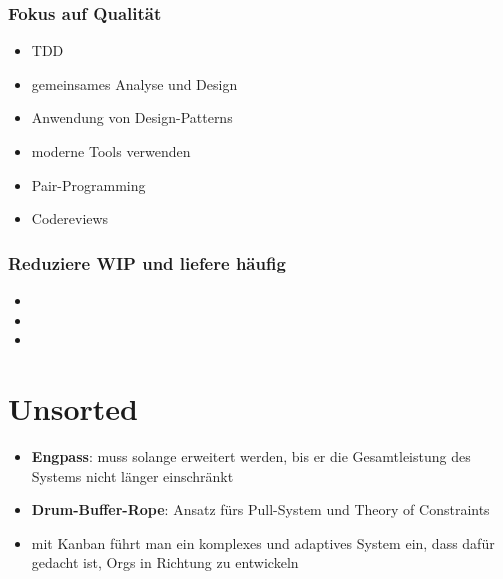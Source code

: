 \subsubsection{Fokus auf Qualität}
\begin{itemize}
  \item TDD
  \item gemeinsames Analyse und Design
  \item Anwendung von Design-Patterns
  \item moderne Tools verwenden
  \item Pair-Programming
  \item Codereviews
\end{itemize}


\subsubsection{Reduziere WIP und liefere häufig}
\begin{itemize}
  \item
  \item
  \item
\end{itemize}


\section{Unsorted}
\begin{itemize}
  \item \textbf{Engpass}: muss solange erweitert werden, bis er die Gesamtleistung des Systems nicht
    länger einschränkt
  \item \textbf{Drum-Buffer-Rope}: Ansatz fürs Pull-System und Theory of Constraints
  \item mit Kanban führt man ein komplexes und adaptives System ein, dass dafür gedacht ist, Orgs in
    Richtung  zu entwickeln
\end{itemize}



